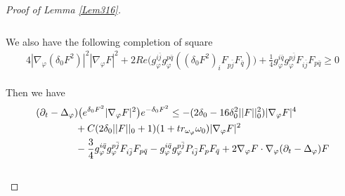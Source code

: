 \documentclass[11pt]{amsart}
\numberwithin{equation}{section}
\begin{document}
\begin{proof}[Proof of Lemma \ref{Lem316}]
\begin{align}
\end{align}\\
We also have the following completion of square  
\begin{align}
	4|\nabla_{\varphi}(\delta_0 F^2)|^2|\nabla_\varphi F|^2 + 2Re\big(g_{\varphi}^{i\bar{j}}g_{\varphi}^{p\bar{q}}((\delta_0 F^2)_iF_{p\bar{j}}F_{\bar{q}})\big) +\frac{1}{4}g_{\varphi}^{i\bar{q}}g_{\varphi}^{p\bar{j}}F_{i\bar{j}}F_{p\bar{q}}\ge  0
\end{align}\\
Then we have 
\begin{align}
	& (\partial_t-\Delta_{\varphi})\big(e^{\delta_0F^2}|\nabla_{\varphi}F|^2\big)e^{-\delta_0F^2} \le  -(2\delta_0-16\delta_0^2 ||F||_0^2)|\nabla_\varphi F|^4 \notag\\
	&\qquad\qquad + C(2\delta_0 ||F||_0 +1)(1+tr_{\omega_{\varphi}}\omega_0) |\nabla_\varphi F|^2 \notag\\
	& \qquad\qquad -\frac{3}{4}g_{\varphi}^{i\bar{q}}g_{\varphi}^{p\bar{j}}F_{i\bar{j}}F_{p\bar{q}} - g_{\varphi}^{i\bar{q}}g_{\varphi}^{p\bar{j}}P_{i\bar{j}} F_pF_{\bar{q}} +2\nabla_{\varphi}F\cdot \nabla_{\varphi}(\partial_t-\Delta_{\varphi})F 
\end{align}\\


\end{proof}
\end{document}
